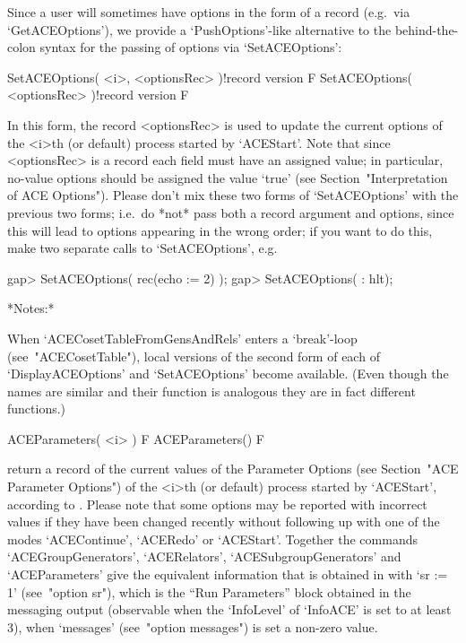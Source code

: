 Since a user will sometimes have options  in  the  form  of  a  record
(e.g.~via   `GetACEOptions'),   we   provide   a    `PushOptions'-like
alternative to the behind-the-colon syntax for the passing of  options
via `SetACEOptions':

\>SetACEOptions( <i>, <optionsRec> )!{record version} F
\>SetACEOptions( <optionsRec> )!{record version} F

In this form, the record <optionsRec> is used to  update  the  current
options of the <i>th (or default) process started by `ACEStart'.  Note
that since <optionsRec> is a record each field must have  an  assigned
value; in particular, no-value {\ACE} options should be  assigned  the
value `true' (see Section~"Interpretation  of  ACE  Options").  Please
don't mix these two forms of `SetACEOptions'  with  the  previous  two
forms; i.e.~do *not* pass both a record argument  and  options,  since
this will lead to options appearing in the wrong order; if you want to
do this, make two separate calls to `SetACEOptions', e.g.

\beginexample
gap> SetACEOptions( rec(echo := 2) );
gap> SetACEOptions( : hlt);
\endexample

*Notes:*

When    `ACECosetTableFromGensAndRels'    enters    a     `break'-loop
(see~"ACECosetTable"), local versions of the second form  of  each  of
`DisplayACEOptions' and `SetACEOptions' become available. (Even though
the names are similar and their function is analogous they are in fact
different functions.)

\>ACEParameters( <i> ) F
\>ACEParameters() F

return a record of the current values of the {\ACE} Parameter  Options
(see Section~"ACE  Parameter  Options")  of  the  <i>th  (or  default)
process started by `ACEStart', according to {\ACE}. Please  note  that
some options may be reported with incorrect values if they  have  been
changed  recently  without  following  up  with  one  of   the   modes
`ACEContinue',  `ACERedo'  or  `ACEStart'.   Together   the   commands
`ACEGroupGenerators',   `ACERelators',   `ACESubgroupGenerators'   and
`ACEParameters'  give  the  equivalent  {\GAP}  information  that   is
obtained in {\ACE} with `sr := 1'  (see~"option  sr"),  which  is  the
``Run Parameters'' block obtained in the messaging output  (observable
when the `InfoLevel'  of  `InfoACE'  is  set  to  at  least  3),  when
`messages' (see~"option messages") is set a non-zero value.

